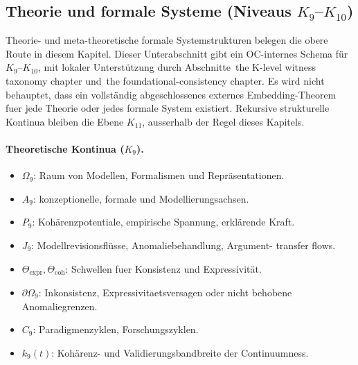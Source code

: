 \subsection{Theorie und formale Systeme (Niveaus \texorpdfstring{$K_9$}{K9}--\texorpdfstring{$K_{10}$}{K10})}

Theorie- und meta-theoretische formale Systemstrukturen belegen die obere Route in
diesem Kapitel. Dieser Unterabschnitt gibt ein OC-internes Schema für
\(K_9\)--\(K_{10}\), mit lokaler Unterstützung durch
Abschnitte~the K-level witness taxonomy chapter und~the foundational-consistency chapter.
Es wird nicht behauptet, dass ein vollständig abgeschlossenes externes
Embedding-Theorem fuer jede Theorie oder jedes formale System existiert. Rekursive
strukturelle Kontinua bleiben die Ebene \(K_{11}\), ausserhalb der Regel dieses
Kapitels.

\paragraph{Theoretische Kontinua (\texorpdfstring{\(K_9\)}{K9}).}
\begin{itemize}
  \item \(\Omega_9\): Raum von Modellen, Formalismen und Repräsentationen.
  \item \(A_9\): konzeptionelle, formale und Modellierungsachsen.
  \item \(P_9\): Kohärenzpotentiale, empirische Spannung, erklärende
        Kraft.
  \item \(J_9\): Modellrevisionsflüsse, Anomaliebehandlung, Argument-
        transfer flows.
  \item \(\Theta_{\mathrm{expr}}, \Theta_{\mathrm{coh}}\): Schwellen fuer
        Konsistenz und Expressivität.
  \item \(\partial\Omega_9\): Inkonsistenz, Expressivitaetsversagen oder
        nicht behobene Anomaliegrenzen.
  \item \(C_9\): Paradigmenzyklen, Forschungszyklen.
  \item \(k_9(t)\): Kohärenz- und Validierungsbandbreite der Continuumness.
\end{itemize}

